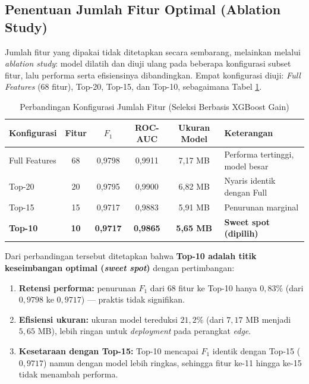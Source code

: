 \documentclass[11pt, a4paper]{article}
\begin{document}
\subsection{Penentuan Jumlah Fitur Optimal (Ablation Study)}
Jumlah fitur yang dipakai tidak ditetapkan secara sembarang, melainkan melalui \textit{ablation study}: model dilatih dan diuji ulang pada beberapa konfigurasi subset fitur, lalu performa serta efisiensinya dibandingkan. Empat konfigurasi diuji: \textit{Full Features} (68 fitur), Top-20, Top-15, dan Top-10, sebagaimana Tabel \ref{tab:ablation}.

\begin{table}[htbp]
\centering
\caption{Perbandingan Konfigurasi Jumlah Fitur (Seleksi Berbasis XGBoost Gain)}
\label{tab:ablation}
\small
\begin{tabularx}{\linewidth}{@{} l c c c c X @{}}
\toprule
\textbf{Konfigurasi} & \textbf{Fitur} & \textbf{$F_1$} & \textbf{ROC-AUC} & \textbf{Ukuran Model} & \textbf{Keterangan} \\ \midrule
Full Features & 68 & 0,9798 & 0,9911 & 7,17 MB & Performa tertinggi, model besar \\ \addlinespace
Top-20 & 20 & 0,9795 & 0,9900 & 6,82 MB & Nyaris identik dengan Full \\ \addlinespace
Top-15 & 15 & 0,9717 & 0,9883 & 5,91 MB & Penurunan marginal \\ \addlinespace
\textbf{Top-10} & \textbf{10} & \textbf{0,9717} & \textbf{0,9865} & \textbf{5,65 MB} & \textbf{Sweet spot (dipilih)} \\ \bottomrule
\end{tabularx}
\end{table}

Dari perbandingan tersebut ditetapkan bahwa \textbf{Top-10 adalah titik keseimbangan optimal (\textit{sweet spot})} dengan pertimbangan:
\begin{enumerate}[leftmargin=1.4cm]
    \item \textbf{Retensi performa:} penurunan $F_1$ dari 68 fitur ke Top-10 hanya $0{,}83\%$ (dari $0{,}9798$ ke $0{,}9717$) --- praktis tidak signifikan.
    \item \textbf{Efisiensi ukuran:} ukuran model tereduksi $21{,}2\%$ (dari $7{,}17$ MB menjadi $5{,}65$ MB), lebih ringan untuk \textit{deployment} pada perangkat \textit{edge}.
    \item \textbf{Kesetaraan dengan Top-15:} Top-10 mencapai $F_1$ identik dengan Top-15 ($0{,}9717$) namun dengan model lebih ringkas, sehingga fitur ke-11 hingga ke-15 tidak menambah performa.
\end{enumerate}
\end{document}
